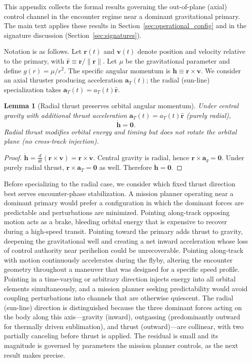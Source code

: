 \documentclass{article}
\newtheorem{lemma}{Lemma}
\begin{document}
This appendix collects the formal results governing the out-of-plane (axial) control channel in the encounter regime near a dominant gravitational primary. The main text applies these results in Section~\ref{sec:operational_config} and in the signature discussion (Section~\ref{sec:signatures}).

Notation is as follows. Let $\mathbf r(t)$ and $\mathbf v(t)$ denote position and velocity relative to the primary, with $\hat{\mathbf r}\equiv \mathbf r/\|\mathbf r\|$. Let $\mu$ be the gravitational parameter and define $g(r)=\mu/r^2$. The specific angular momentum is $\mathbf h\equiv \mathbf r\times \mathbf v$. We consider an axial thruster producing acceleration $\mathbf a_T(t)$; the radial (sun-line) specialization takes $\mathbf a_T(t)=a_T(t)\hat{\mathbf r}$.

\begin{lemma}[Radial thrust preserves orbital angular momentum]
\label{lem:radial_h}
Under central gravity with additional thrust acceleration $\mathbf a_T(t)=a_T(t)\hat{\mathbf r}$ (purely radial),
\begin{equation}
\dot{\mathbf h}=\mathbf 0.
\end{equation}
Radial thrust modifies orbital energy and timing but does not rotate the orbital plane (no cross-track injection).
\end{lemma}

\begin{proof}
$\dot{\mathbf h}=\frac{d}{dt}(\mathbf r\times \mathbf v)=\mathbf r\times \dot{\mathbf v}$. Central gravity is radial, hence $\mathbf r\times \mathbf a_g=\mathbf 0$. Under purely radial thrust, $\mathbf r\times \mathbf a_T=\mathbf 0$ as well. Therefore $\dot{\mathbf h}=\mathbf 0$.
\end{proof}

Before specializing to the radial case, we consider which fixed thrust direction best serves encounter-phase stabilization. A mission planner operating near a dominant primary would prefer a configuration in which the dominant forces are predictable and perturbations are minimized. Pointing along-track opposing motion acts as a brake, bleeding orbital energy that is expensive to recover during a high-speed transit. Pointing toward the primary adds thrust to gravity, deepening the gravitational well and creating a net inward acceleration whose loss of control authority near perihelion could be unrecoverable. Pointing along-track with motion continuously accelerates during the flyby, altering the encounter geometry throughout a maneuver that was designed for a specific speed profile. Pointing in a time-varying or arbitrary direction injects energy into all orbital elements simultaneously, and a mission planner seeking predictability would avoid coupling perturbations into channels that are otherwise quiescent. The radial (sun-line) direction is distinguished because the three dominant forces acting on the body along this axis---gravity (inward), outgassing (predominantly outward for thermally driven sublimation), and thrust (outward)---are collinear, with two partially canceling before thrust is applied. The residual is small and its magnitude is governed by parameters the mission planner controls, as the next result makes precise.
\end{document}
